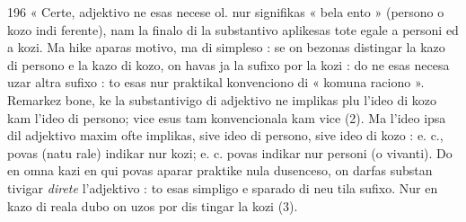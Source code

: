 \begin{VUpage}[200]{196}
« Certe,  adjektivo ne esas necese \nl
ol.  nur signifikas « bela ento » (persono o kozo indi\cc
ferente), nam la finalo  di la substantivo aplikesas tote\nl
egale a personi ed a kozi. Ma hike aparas motivo, \nl
{} ma di simpleso : se on bezonas distingar la kazo\nl
di persono e la kazo di kozo, on havas ja la sufixo  por\nl
la kozi : do ne esas necesa uzar altra sufixo : to esas nur\nl
praktikal konvenciono di « komuna raciono ». Remarkez\nl
bone, ke la substantivigo di adjektivo ne implikas plu l'ideo\nl
di kozo kam l'ideo di persono;  vice  esus tam\nl
konvencionala kam  vice  (2). Ma l'ideo ipsa\nl
dil adjektivo maxim ofte implikas, sive ideo di persono,\nl
sive ideo di kozo :  e. c., povas (natu\cc
rale) indikar nur kozi;  e. c. povas\nl
indikar nur personi (o vivanti). Do en omna kazi en qui\nl
povas aparar praktike nula dusenceso, on darfas substan\cc
tivigar \textit{direte} l'adjektivo : to esas simpligo e sparado di neu\cc
tila sufixo. Nur en kazo di reala dubo on uzos  por dis\cc
tingar la kozi (3).
\end{VUpage}

